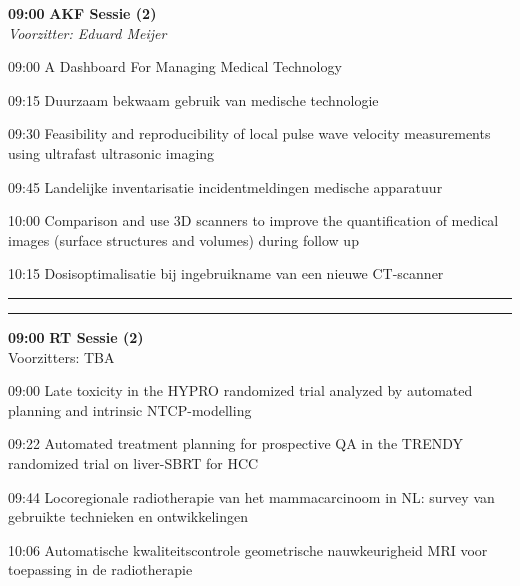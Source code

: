 \documentclass[a4paper,10pt]{report}
\begin{document}
\begin{multicols*}{3}
\begin{packed_enum}
\item[\textbf{09:00}] \textbf{AKF Sessie (2)}\\\textit{Voorzitter: Eduard Meijer}
\item[09:00] A Dashboard For Managing Medical Technology
\item[09:15] Duurzaam bekwaam gebruik van medische technologie
\item[09:30] Feasibility and reproducibility of local pulse wave velocity measurements using ultrafast ultrasonic imaging
\item[09:45] Landelijke inventarisatie incidentmeldingen medische apparatuur 
\item[10:00] Comparison and use 3D scanners to improve the quantification of medical images (surface structures and volumes) during follow up 
\item[10:15] Dosisoptimalisatie bij ingebruikname van een nieuwe CT-scanner 
\end{packed_enum} %

\vfill

\columnbreak

\hrule\vspace{2mm}
\vspace{2mm}\hrule\strut

\vfill

\begin{packed_enum}
\item[\textbf{09:00}]{\textbf{RT Sessie (2)}}\\Voorzitters: TBA
\item[09:00] Late toxicity in the HYPRO randomized trial analyzed by automated planning and intrinsic NTCP-modelling
\item[09:22] Automated treatment planning for prospective QA in the TRENDY randomized trial on liver-SBRT for HCC
\item[09:44] Locoregionale radiotherapie van het mammacarcinoom in NL: survey van gebruikte technieken en ontwikkelingen
\item[10:06] Automatische kwaliteitscontrole geometrische nauw\-keur\-igheid MRI voor toepassing in de radiotherapie
\end{packed_enum} %



\end{multicols*}
\end{document}
